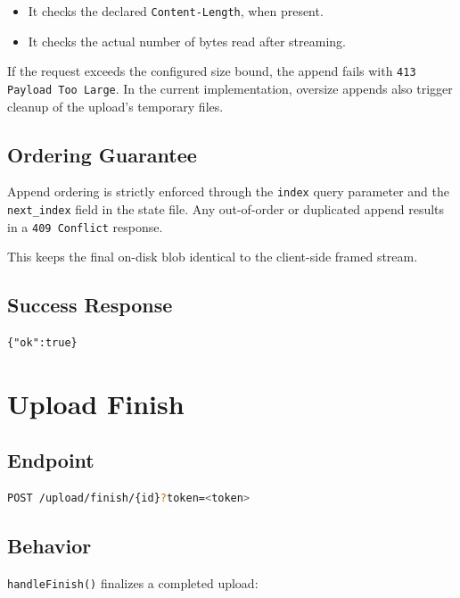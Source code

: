 \documentclass[11pt,a4paper]{report}
\begin{document}
\begin{itemize}[leftmargin=1.5cm]
    \item It checks the declared \texttt{Content-Length}, when present.
    \item It checks the actual number of bytes read after streaming.
\end{itemize}

If the request exceeds the configured size bound, the append fails with \texttt{413 Payload Too Large}. In the current implementation, oversize appends also trigger cleanup of the upload's temporary files.

\subsection{Ordering Guarantee}

Append ordering is strictly enforced through the \texttt{index} query parameter and the \texttt{next\_index} field in the state file. Any out-of-order or duplicated append results in a \texttt{409 Conflict} response.

This keeps the final on-disk blob identical to the client-side framed stream.

\subsection{Success Response}

\begin{lstlisting}[language={}]
{"ok":true}
\end{lstlisting}

\section{Upload Finish}

\subsection{Endpoint}

\begin{lstlisting}[language=bash]
POST /upload/finish/{id}?token=<token>
\end{lstlisting}

\subsection{Behavior}

\texttt{handleFinish()} finalizes a completed upload:
\end{document}
